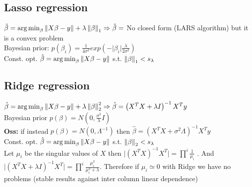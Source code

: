 \subsection*{Lasso regression}
\(\hat{\beta} = \operatorname*{arg\,min}_{\beta}{\left\lVert X\beta - y\right\rVert} + \lambda\left\lVert\beta\right\rVert_{1}\Rightarrow \hat{\beta} =\)  No closed form (LARS algorithm) but it is a convex problem\\
Bayesian prior: \(p(\beta_i) = \frac{1}{4\sigma^2}exp\left(-\vert\beta_i\vert\frac{\lambda}{2\sigma^2}\right)\)\\
{Const. opt. \scriptsize  $\hat{\beta} = \operatorname*{arg\,min}_{\beta}{\left\lVert X\beta - y\right\rVert}$ s.t. $\left\lVert\beta\right\rVert_1<s_\lambda$}
\subsection*{Ridge regression}
\(\hat{\beta} = \operatorname*{arg\,min}_{\beta}{\left\lVert X\beta - y\right\rVert} + \lambda\left\lVert\beta\right\rVert_{2}^{2}\Rightarrow \hat{\beta}  =  \left(X^TX + \lambda I\right)^{-1}X^T y\) \\
Bayesian prior \(p(\beta) = N(0, \frac{\sigma^2}{\lambda}I)\)\\ 
\textbf{Oss:} if instead \(p(\beta) = N(0, \Lambda^{-1})\) then $\hat{\beta} = \left(X^TX + \sigma^2 \Lambda\right)^{-1}X^T y$\\
{Const. opt. \scriptsize  $\hat{\beta} = \operatorname*{arg\,min}_{\beta}{\left\lVert X\beta - y\right\rVert}$ s.t. $\left\lVert\beta\right\rVert_2<s_\lambda$}\\ 
Let \(\mu_i\) be the singular values of \(X\) then \(\vert \left(X^TX \right)^{-1}X^T \vert = \prod^{i} \frac{1}{\mu_i}\) . And  \(\vert \left(X^TX + \lambda I \right)^{-1}X^T \vert =
 \prod^{i} \frac{\mu_i^2}{\mu_i^2 + \lambda}\). Therefore if \(\mu_i \simeq 0\) with Ridge we have no problems (stable results against inter column linear dependence)
